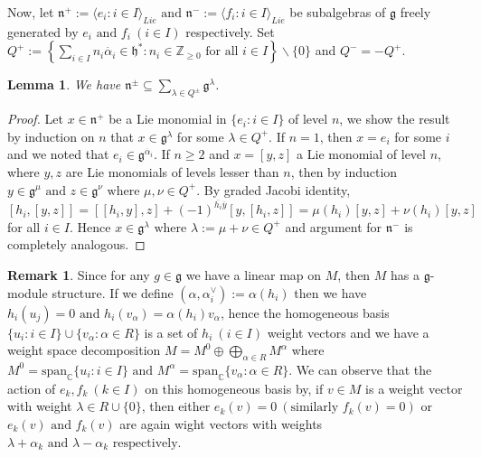 \documentclass[11pt]{amsart}
\theoremstyle{plain}
\newtheorem{lemma}[thm]{Lemma}
\theoremstyle{definition}
\newtheorem{rmk}[thm]{Remark}
\numberwithin{equation}{section}
\newcommand{\al}{\alpha}
\newcommand{\la}{\lambda}
\newcommand{\Z}{\mbox{$\mathbb Z$}}
\newcommand{\C}{\mbox{$\mathbb C$}}     %
\newcommand{\g}{\mathfrak{g}}
\newcommand{\h}{\mathfrak{h}}
\begin{document}
	Now, let $\mathfrak{n}^+:=\langle e_i:i\in I\rangle_{Lie}\text{ and }\mathfrak{n}^-:=\langle f_i:i\in I\rangle_{Lie}$ be subalgebras of $\g$ freely generated by $e_i\text{ and }f_i~(i\in I)$ respectively. Set $Q^+:=\left\{\sum\limits_{i\in I}n_i\dot{\al_i}\in\h^*:n_i\in\Z_{\geq0}\text{ for all }i\in I\right\}\backslash\{0\}$ and $Q^-=-Q^+$. 
	\begin{lemma}
		We have $\mathfrak{n}^{\pm}\subseteq\sum\limits_{\la\in Q^{\pm}}\g^{\la}$.
	\end{lemma}
	\begin{proof}
		Let $x\in\mathfrak{n}^+$ be a Lie monomial in $\{e_i:i\in I\}$ of level $n$, we show the result by induction on $n$ that $x\in \g^{\la}$ for some $\la\in Q^+$. If $n=1$, then $x=e_i$ for some $i$ and we noted that $e_i\in\g^{\dot{\al_i}}$. If $n\geq 2$ and $x=[y,z]$ a Lie monomial of level $n$, where $y,z$ are Lie monomials of levels lesser than $n$, then by induction $y\in\g^{\mu}\text{ and }z\in\g^{\nu}\text{ where }\mu,\nu\in Q^+$. By graded Jacobi identity, $[h_i,[y,z]]=[[h_i,y],z]+(-1)^{\overline{h_i}\overline{y}}[y,[h_i,z]]=\mu(h_i)[y,z]+\nu(h_i)[y,z]$ for all $i\in I$. Hence $x\in\g^{\la}\text{ where }\la:=\mu+\nu\in Q^+$ and argument for $\mathfrak{n}^-$ is completely analogous.
	\end{proof}
	\begin{rmk}
		Since for any $g\in\g$ we have a linear map on $M$, then $M$ has a $\g$-module structure. If we define $(\al,\al_i^{\vee}):=\al(h_i)$ then we have $h_i(u_j)=0\text{ and }h_i(v_{\al})=\al(h_i)v_{\al}$, hence the homogeneous basis $\{u_i:i\in I\}\cup\{v_{\al}:\al\in R\}$ is a set of $h_i~(i\in I)$ weight vectors and we have a weight space decomposition $M=M^0\oplus\bigoplus\limits_{\al\in R}M^{\al}$ where $M^0=\text{span}_{\C}\{u_i:i\in I\}\text{ and }M^{\al}=\text{span}_{\C}\{v_{\al}:\al\in R\}$. We can observe that the action of $e_k,f_k~(k\in I)$ on this homogeneous basis by, if $v\in M$ is a weight vector with weight $\la\in R\cup\{0\}$, then either $e_k(v)=0~(\text{similarly }f_k(v)=0)$ or $e_k(v)\text{ and }f_k(v)$ are again wight vectors with weights $\la+\al_k\text{ and }\la-\al_k\text{ respectively}$.
		
	\end{rmk}
	
\end{document}
